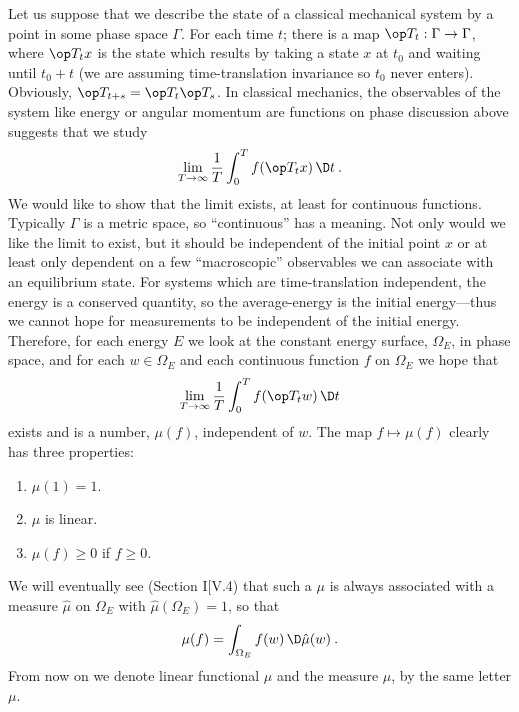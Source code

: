 Let us suppose that we describe the state of a classical mechanical system by a point in some phase space $\Gamma$. For each time $t$; there is a map $\op T_t : \Gamma \to \Gamma$, where $\op T_t x$ is the state which results by taking a state $x$ at $t_0$ and waiting until $t_0 + t$ (we are assuming time-translation invariance so $t_0$ never enters).
Obviously, $\op T_{t+s} = \op T_t \op T_s$. In classical mechanics, the observables of the system like energy or angular momentum are functions on phase discussion above suggests that we study
\begin{align}
    \lim_{T \rightarrow \infty} \frac{1}{T} \int_0^T f(\op T_t x) \, \D t \:.
\end{align}
We would like to show that the limit exists, at least for continuous functions. Typically $\Gamma$ is a metric space, so \enquote{continuous} has a meaning. Not only would we like the limit to exist, but it should be independent of the initial point $x$ or at least only dependent on a few \enquote{macroscopic} observables we can associate with an equilibrium state. For systems which are time-translation independent, the energy is a conserved quantity, so the average-energy is the initial energy—thus we cannot hope for measurements to be independent of the initial energy. Therefore, for each energy $E$ we look at the constant energy surface, $\Omega_E$, in phase space, and for each  $w \in \Omega_E$ and each continuous function $f$ on $\Omega_E$ we hope that
\begin{align}
    \lim_{T \rightarrow \infty} \frac{1}{T} \int_0^T f(\op T_t w) \, \D t
\end{align}
exists and is a number, $\mu(f)$, independent of $w$. The map $f \mapsto \mu(f)$ clearly has three properties:
\begin{enumerate}
    \item $\mu(1)=1$.
    \item $\mu$ is linear.
    \item $\mu(f) \geq 0$ if $f \geq 0$.
\end{enumerate}
We will eventually see (Section I[V.4) that such a $\mu$ is always associated with a measure $\hat{\mu}$ on $\Omega_E$ with $\hat{\mu}(\Omega_E) = 1$, so that
\begin{align}
    \mu(f) = \int_{\Omega_E} f(w) \, \D \hat{\mu}(w) \:.
\end{align}
From now on we denote linear functional $\mu$ and the measure $\hat{\mu}$, by the same letter $\mu$.

